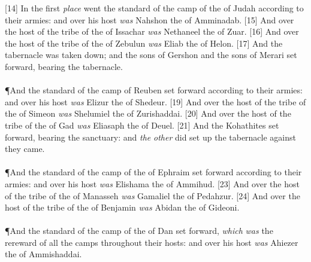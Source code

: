 [14] \textcolor[cmyk]{0.99998,1,0,0}{In the first \emph{place} went the standard of the camp of the  of Judah according to their armies: and over his host \emph{was} Nahshon the  of Amminadab.}
[15] \textcolor[cmyk]{0.99998,1,0,0}{And over the host of the tribe of the  of Issachar \emph{was} Nethaneel the  of Zuar.}
[16] \textcolor[cmyk]{0.99998,1,0,0}{And over the host of the tribe of the  of Zebulun \emph{was} Eliab the  of Helon.}
[17] \textcolor[cmyk]{0.99998,1,0,0}{And the tabernacle was taken down; and the sons of Gershon and the sons of Merari set forward, bearing the tabernacle.}\\
\\
\P \textcolor[cmyk]{0.99998,1,0,0}{And the standard of the camp of Reuben set forward according to their armies: and over his host \emph{was} Elizur the  of Shedeur.}
[19] \textcolor[cmyk]{0.99998,1,0,0}{And over the host of the tribe of the  of Simeon \emph{was} Shelumiel the  of Zurishaddai.}
[20] \textcolor[cmyk]{0.99998,1,0,0}{And over the host of the tribe of the  of Gad \emph{was} Eliasaph the  of Deuel.}
[21] \textcolor[cmyk]{0.99998,1,0,0}{And the Kohathites set forward, bearing the sanctuary: and \emph{the} \emph{other} did set up the tabernacle against they came.}\\
\\
\P \textcolor[cmyk]{0.99998,1,0,0}{And the standard of the camp of the  of Ephraim set forward according to their armies: and over his host \emph{was} Elishama the  of Ammihud.}
[23] \textcolor[cmyk]{0.99998,1,0,0}{And over the host of the tribe of the  of Manasseh \emph{was} Gamaliel the  of Pedahzur.}
[24] \textcolor[cmyk]{0.99998,1,0,0}{And over the host of the tribe of the  of Benjamin \emph{was} Abidan the  of Gideoni.}\\
\\
\P \textcolor[cmyk]{0.99998,1,0,0}{And the standard of the camp of the  of Dan set forward, \emph{which} \emph{was} the rereward of all the camps throughout their hosts: and over his host \emph{was} Ahiezer the  of Ammishaddai.}

